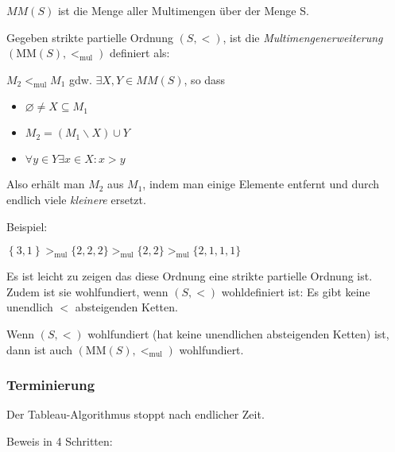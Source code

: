 $MM(S)$ ist die Menge aller Multimengen über der Menge S.

Gegeben strikte partielle Ordnung $\left( S, < \right)$, ist die
\emph{Multimengenerweiterung} $\left( \text{MM}\left( S \right), <_{\text{mul}} \right)$ definiert als: 

$M_{2} <_{\text{mul}}M_{1}$ gdw. $\exists X,Y \in MM(S)$, so dass

\begin{itemize}
\item
  $\varnothing \neq X \subseteq M_{1}$
\item
  $M_{2} = \left( M_{1} \smallsetminus X \right) \cup Y$
\item
  $\forall y \in Y\exists x \in X : x > y$
\end{itemize}

Also erhält man $M_2$ aus $M_1$, indem man einige Elemente entfernt und durch endlich viele \emph{kleinere} ersetzt.

Beispiel:

$\left\{ 3,1 \right\} >_{\text{mul}}\{ 2,2,2\} >_{\text{mul}}\{ 2,2\} >_{\text{mul}}\{ 2,1,1,1\}$

Es ist leicht zu zeigen das diese Ordnung eine strikte partielle Ordnung ist.  Zudem ist sie wohlfundiert, wenn $(S,<)$ wohldefiniert ist: Es gibt keine unendlich $<$ absteigenden Ketten.

\setcounter{definition}{5}
\begin{theorem}

Wenn $\left( S, < \right)$ wohlfundiert (hat keine unendlichen
absteigenden Ketten) ist, dann ist auch $\left( \text{MM}\left( S \right), <_{\text{mul}} \right)$
wohlfundiert.
\end{theorem}

\setcounter{definition}{4}

\subsubsection{Terminierung}

\begin{proposition}

Der Tableau-Algorithmus stoppt nach endlicher Zeit.
\end{proposition}
\setcounter{definition}{6}

Beweis in 4 Schritten:

